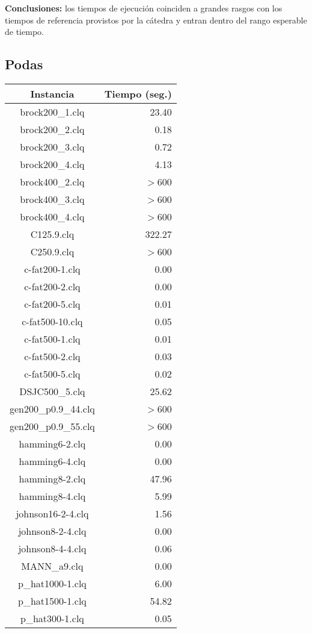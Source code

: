 \documentclass[10pt, a4paper]{article}
\begin{document}
\textbf{Conclusiones:} los tiempos de ejecución coinciden a grandes rasgos con los tiempos de referencia provistos por la cátedra y entran dentro del rango esperable de tiempo.

\subsection{Podas}

\begin{center}
\begin{tabular}{ c r } 
Instancia & Tiempo (seg.) \\
\hline
brock200\_1.clq & 23.40 \\
brock200\_2.clq & 0.18 \\
brock200\_3.clq & 0.72 \\
brock200\_4.clq & 4.13 \\
brock400\_2.clq & $>$600 \\
brock400\_3.clq & $>$600 \\
brock400\_4.clq & $>$600 \\
C125.9.clq & 322.27 \\ 
C250.9.clq & $>$600 \\
c-fat200-1.clq & 0.00 \\
c-fat200-2.clq & 0.00 \\
c-fat200-5.clq & 0.01 \\
c-fat500-10.clq & 0.05 \\
c-fat500-1.clq & 0.01 \\
c-fat500-2.clq & 0.03 \\
c-fat500-5.clq & 0.02 \\
DSJC500\_5.clq & 25.62 \\
gen200\_p0.9\_44.clq & $>$600 \\
gen200\_p0.9\_55.clq & $>$600 \\
hamming6-2.clq & 0.00 \\
hamming6-4.clq & 0.00 \\
hamming8-2.clq & 47.96 \\
hamming8-4.clq & 5.99 \\
johnson16-2-4.clq & 1.56 \\
johnson8-2-4.clq & 0.00 \\
johnson8-4-4.clq & 0.06 \\
MANN\_a9.clq & 0.00 \\
p\_hat1000-1.clq & 6.00 \\
p\_hat1500-1.clq & 54.82 \\
p\_hat300-1.clq & 0.05 \\

\end{tabular}
\end{center}
\end{document}
